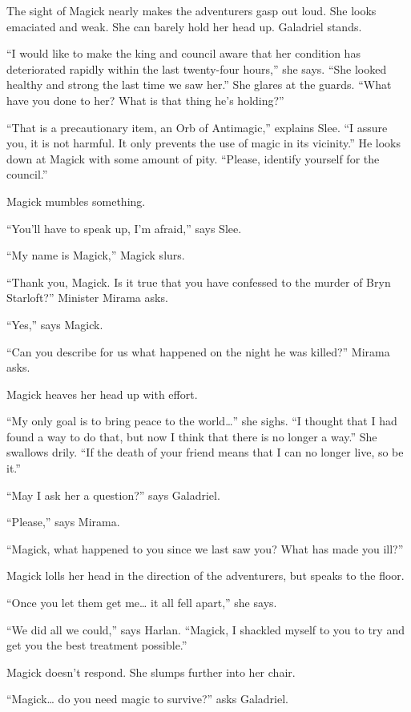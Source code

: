\documentclass[smalldemyvopaper,11pt,twoside,onecolumn,openright,extrafontsizes]{memoir}
\begin{document}
The sight of Magick nearly makes the adventurers gasp out loud. She
looks emaciated and weak. She can barely hold her head up. Galadriel
stands.

``I would like to make the king and council aware that her condition has
deteriorated rapidly within the last twenty-four hours,'' she says.
``She looked healthy and strong the last time we saw her.'' She glares
at the guards. ``What have you done to her? What is that thing he's
holding?''

``That is a precautionary item, an Orb of Antimagic,'' explains Slee.
``I assure you, it is not harmful. It only prevents the use of magic in
its vicinity.'' He looks down at Magick with some amount of pity.
``Please, identify yourself for the council.''

Magick mumbles something.

``You'll have to speak up, I'm afraid,'' says Slee.

``My name is Magick,'' Magick slurs.

``Thank you, Magick. Is it true that you have confessed to the murder of
Bryn Starloft?'' Minister Mirama asks.

``Yes,'' says Magick.

``Can you describe for us what happened on the night he was killed?''
Mirama asks.

Magick heaves her head up with effort.

``My only goal is to bring peace to the world\ldots{}'' she sighs. ``I
thought that I had found a way to do that, but now I think that there is
no longer a way.'' She swallows drily. ``If the death of your friend
means that I can no longer live, so be it.''

``May I ask her a question?'' says Galadriel.

``Please,'' says Mirama.

``Magick, what happened to you since we last saw you? What has made you
ill?''

Magick lolls her head in the direction of the adventurers, but speaks to
the floor.

``Once you let them get me\ldots{} it all fell apart,'' she says.

``We did all we could,'' says Harlan. ``Magick, I shackled myself to you
to try and get you the best treatment possible.''

Magick doesn't respond. She slumps further into her chair.

``Magick\ldots{} do you need magic to survive?'' asks Galadriel.
\end{document}
